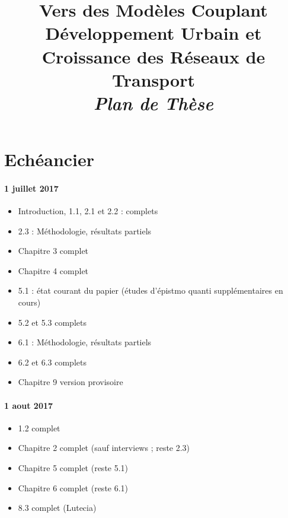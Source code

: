 




\title{Vers des Modèles Couplant Développement Urbain et Croissance des Réseaux de Transport\bigskip\\
\textit{Plan de Thèse}
}
\author{}


\maketitle

\justify


\begin{abstract}
\end{abstract}


\section*{Echéancier}

\paragraph{1 juillet 2017}

\begin{itemize}
\item Introduction, 1.1, 2.1 et 2.2 : complets
\item 2.3 : Méthodologie, résultats partiels
\item Chapitre 3 complet
\item Chapitre 4 complet
\item 5.1 : état courant du papier \cite{antelope2016interdisciplinary} (études d'épistmo quanti supplémentaires en cours)
\item 5.2 et 5.3 complets
\item 6.1 : Méthodologie, résultats partiels
\item 6.2 et 6.3 complets
\item Chapitre 9 version provisoire
\end{itemize}



\paragraph{1 aout 2017}

\begin{itemize}
\item 1.2 complet
\item Chapitre 2 complet (sauf interviews ; reste 2.3)
\item Chapitre 5 complet (reste 5.1)
\item Chapitre 6 complet (reste 6.1)
\item 8.3 complet (Lutecia)
\end{itemize}

